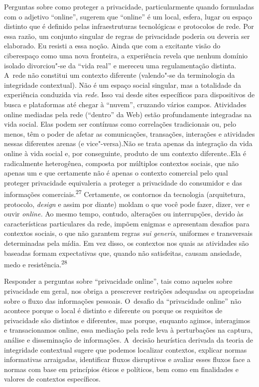 Perguntas sobre como proteger a privacidade, particularmente quando
formuladas com o adjetivo ``online'', sugerem que ``online'' é um local,
esfera, lugar ou espaço distinto que é definido pelas infraestruturas
tecnológicas e protocolos de rede. Por essa razão, um conjunto singular
de regras de privacidade poderia ou deveria ser elaborado. Eu resisti a
essa noção. Ainda que com a excitante visão do ciberespaço como uma nova
fronteira, a experiência revela que nenhum domínio isolado divorciou"-se
da ``vida real'' e mereceu uma regulamentação distinta. A~rede não
constitui um contexto diferente (valendo"-se da terminologia da
integridade contextual). Não é um espaço social singular, mas a
totalidade da experiência conduzida via \emph{rede}. Isso vai desde
sites específicos para dispositivos de busca e plataformas até chegar à
``nuvem'', cruzando vários campos. Atividades online mediadas pela rede
(``dentro'' da Web) estão profundamente integradas na vida social. Elas
podem ser contínuas como correlações tradicionais ou, pelo menos, têm o
poder de afetar as comunicações, transações, interações e atividades
nessas diferentes arenas (e vice"-versa).Não se trata apenas da
integração da vida online à vida social e, por conseguinte, produto de
um contexto diferente..Ela é radicalmente heterogênea, composta por
múltiplos contextos sociais, que não apenas um e que certamente não é
apenas o contexto comercial pelo qual proteger privacidade equivaleria a
proteger a privacidade do consumidor e das informações
comerciais.\textsuperscript{{27}} Certamente, os contornos da tecnologia
(arquitetura, protocolo, \emph{design} e assim por diante) moldam o que
você pode fazer, dizer, ver e ouvir \emph{online.} Ao mesmo tempo,
contudo, alterações ou interrupções, devido às características
particulares da rede, impõem enigmas e apresentam desafios para
contextos sociais, o que não garantem regras \emph{sui generis},
uniformes e transversais determinadas pela mídia. Em vez disso, os
contextos nos quais as atividades são baseadas formam expectativas que,
quando não satisfeitas, causam ansiedade, medo e
resistência.\textsuperscript{{28}}

Responder a perguntas sobre ``privacidade online'', tais como aqueles
sobre privacidade em geral, nos obriga a prescrever restrições adequadas
ou apropriadas sobre o fluxo das informações pessoais. O~desafio da
``privacidade online'' não acontece porque o local é distinto e
diferente ou porque os requisitos de privacidade são distintos e
diferentes, mas porque, enquanto agimos, interagimos e transacionamos
online, essa mediação pela rede leva à perturbações na captura, análise
e disseminação de informações. A~decisão heurística derivada da teoria
de integridade contextual sugere que podemos localizar contextos,
explicar normas informativas arraigadas, identificar fluxos disruptivos
e avaliar esses fluxos face a normas com base em princípios éticos e
políticos, bem como em finalidades e valores de contextos específicos.

